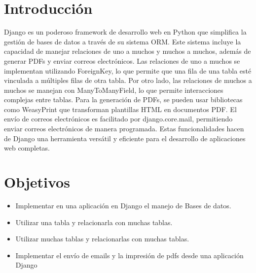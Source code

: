 \documentclass{article}
\begin{document}
  \section{Introducción}
    Django es un poderoso framework de desarrollo web en Python que simplifica la gestión de bases de datos a 
    través de su sistema ORM. Este sistema incluye la capacidad de manejar relaciones de uno a muchos y muchos 
    a muchos, además de generar PDFs y enviar correos electrónicos. Las relaciones de uno a muchos se implementan 
    utilizando ForeignKey, lo que permite que una fila de una tabla esté vinculada a múltiples filas de otra tabla. 
    Por otro lado, las relaciones de muchos a muchos se manejan con ManyToManyField, lo que permite interacciones 
    complejas entre tablas. Para la generación de PDFs, se pueden usar bibliotecas como WeasyPrint que transforman 
    plantillas HTML en documentos PDF. El envío de correos electrónicos es facilitado por django.core.mail, permitiendo 
    enviar correos electrónicos de manera programada. Estas funcionalidades hacen de Django una herramienta versátil y 
    eficiente para el desarrollo de aplicaciones web completas.


  \section{Objetivos}
    \begin{itemize}
      \item Implementar en una aplicación en Django el manejo de Bases de datos.
      \item Utilizar una tabla y relacionarla con muchas tablas.
      \item Utilizar muchas tablas y relacionarlas con muchas tablas.
      \item Implementar el envío de emails y la impresión de pdfs desde una aplicación Django
    \end{itemize}

 
\end{document}
